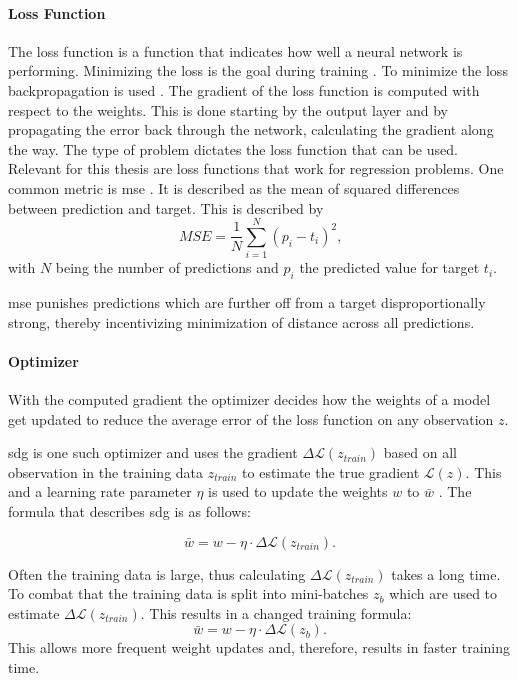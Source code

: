 \paragraph{Loss Function}
\label{par:Foundations:NeuralNetworks:Training:Loss}

The loss function is a function that indicates how well a neural network is performing. Minimizing the loss is the goal during training \cite{teuwen2020convolutional}. To minimize the loss backpropagation is used \cite{nielsen2015neural}. The gradient of the loss function is computed with respect to the weights. This is done starting by the output layer and by propagating the error back through the network, calculating the gradient along the way. The type of problem dictates the loss function that can be used. Relevant for this thesis are loss functions that work for regression problems. One common metric is \ac{mse} \cite{goodfellow2016deep}. It is described as the mean of squared differences between prediction and target. This is described by $$ MSE = \frac{1}{N} \sum_{i=1}^N (p_i - t_i)^2 \text{,}$$ with $N$ being the number of predictions and $p_i$ the predicted value for target $t_i$.

\Ac{mse} punishes predictions which are further off from a target disproportionally strong, thereby incentivizing minimization of distance across all predictions.


\paragraph{Optimizer}
\label{par:Foundations:NeuralNetworks:Training:Optimizer}

With the computed gradient the optimizer decides how the weights of a model get updated to reduce the average error of the loss function on any observation $z$.

\Ac{sdg} is one such optimizer and uses the gradient $\Delta \mathcal{L}(z_{train})$ based on all observation in the training data $z_{train}$ to estimate the true gradient $\mathcal{L}(z)$. This and a learning rate parameter $\eta$ is used to update the weights $w$ to $\bar{w}$ \cite{murphy2022probabilistic}. The formula that describes \ac{sdg} is as follows:

$$ \bar{w} = w - \eta \cdot \Delta \mathcal{L}(z_{train}).$$

Often the training data is large, thus calculating $\Delta \mathcal{L}(z_{train})$ takes a long time. To combat that the training data is split into mini-batches $z_{b}$ which are used to estimate $\Delta \mathcal{L}(z_{train})$. This results in a changed training formula:
$$ \bar{w} = w - \eta \cdot \Delta \mathcal{L}(z_{b}).$$ This allows more frequent weight updates and, therefore, results in faster training time.


